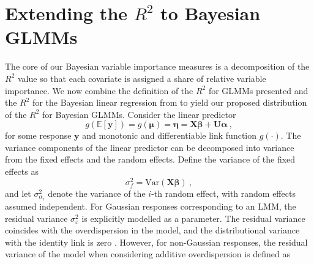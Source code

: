 
\section{Extending the \texorpdfstring{$R^2$}{Lg} to Bayesian GLMMs}
\label{sec:R2_Bayes_GLMM}
The core of our Bayesian variable importance measures is a decomposition of the $R^2$ value so that each covariate is assigned a share of relative variable importance. We now combine the definition of the $R^2$ for GLMMs presented  and the $R^2$ for the Bayesian linear regression from  to yield our proposed distribution of the $R^2$ for Bayesian GLMMs. Consider the linear predictor 
\begin{equation}
    \label{eq:linear_predictor}
    g(\mathbb{E}[\mathbf{y}]) = g(\boldsymbol{\mu}) = \boldsymbol{\eta} = \mathbf{X}\boldsymbol{\beta} + \mathbf{U}\boldsymbol{\alpha} \ ,
\end{equation} 
for some response $\mathbf{y}$ and monotonic and differentiable link function $g(\cdot)$. 
The variance components of the linear predictor can be decomposed into variance from the fixed effects and the random effects. Define the variance of the fixed effects as 
\begin{equation}
    \sigma_{f}^2 = \text{Var}(\mathbf{X}\boldsymbol{\beta}) \ ,
\end{equation}
and let $\sigma^2_{\alpha_i}$ denote the variance of the $i$-th random effect, with random effects assumed independent. For Gaussian responses corresponding to an LMM, the residual variance $\sigma^2_{\varepsilon}$ is explicitly modelled as a parameter. The residual variance coincides with the overdispersion in the model, and the distributional variance with the identity link is zero \citep{nakagawa2013general}. However, for non-Gaussian responses, the residual variance of the model when considering additive overdispersion is defined as

